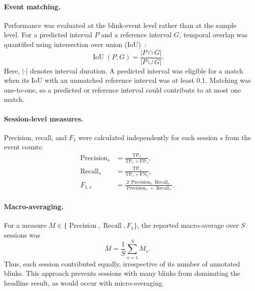 \paragraph{Event matching.}
Performance was evaluated at the blink-event level rather than at the sample level. For a predicted interval $P$ and a reference interval $G$, temporal
overlap was quantified using intersection over union (IoU)~\cite{Startsev2023}:
\begin{equation}
    \operatorname{IoU}(P,G)
    = \frac{|P \cap G|}{|P \cup G|}.
\end{equation}
Here, $|\cdot|$ denotes interval duration.
A predicted interval was eligible for a match when its IoU with an unmatched reference interval was at least 0.1.
Matching was one-to-one, so a predicted or reference interval could contribute to at most one match.


\paragraph{Session-level measures.}
Precision, recall, and $F_1$ were calculated independently for each session $s$ from the event counts:
\begin{align}
    \operatorname{Precision}_s
        &= \frac{\mathrm{TP}_s}{\mathrm{TP}_s+\mathrm{FP}_s}, \\
    \operatorname{Recall}_s
        &= \frac{\mathrm{TP}_s}{\mathrm{TP}_s+\mathrm{FN}_s}, \\
    F_{1,s}
        &= \frac{2\,\operatorname{Precision}_s\operatorname{Recall}_s}
        {\operatorname{Precision}_s+\operatorname{Recall}_s}.
\end{align}

\paragraph{Macro-averaging.}
For a measure $M\in\{\operatorname{Precision},\operatorname{Recall},F_1\}$,
the reported macro-average over $S$ sessions was
\begin{equation}
    \overline{M}=\frac{1}{S}\sum_{s=1}^{S}M_s.
\end{equation}
Thus, each session contributed equally, irrespective of its number of annotated  blinks. This approach prevents sessions with many blinks from dominating the headline result, as would occur with micro-averaging.
